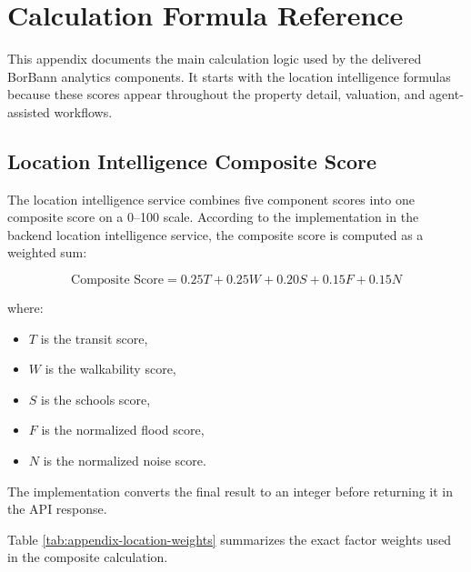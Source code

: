 \appendix
\chapter{Calculation Formula Reference}

This appendix documents the main calculation logic used by the delivered BorBann analytics components. It starts with the location intelligence formulas because these scores appear throughout the property detail, valuation, and agent-assisted workflows.

\section{Location Intelligence Composite Score}

The location intelligence service combines five component scores into one composite score on a 0--100 scale. According to the implementation in the backend location intelligence service, the composite score is computed as a weighted sum:

\begin{equation}
\label{eq:appendix-location-composite}
\text{Composite Score} = 0.25T + 0.25W + 0.20S + 0.15F + 0.15N
\end{equation}

where:

\begin{itemize}
    \item $T$ is the transit score,
    \item $W$ is the walkability score,
    \item $S$ is the schools score,
    \item $F$ is the normalized flood score,
    \item $N$ is the normalized noise score.
\end{itemize}

The implementation converts the final result to an integer before returning it in the API response.

Table \ref{tab:appendix-location-weights} summarizes the exact factor weights used in the composite calculation.

